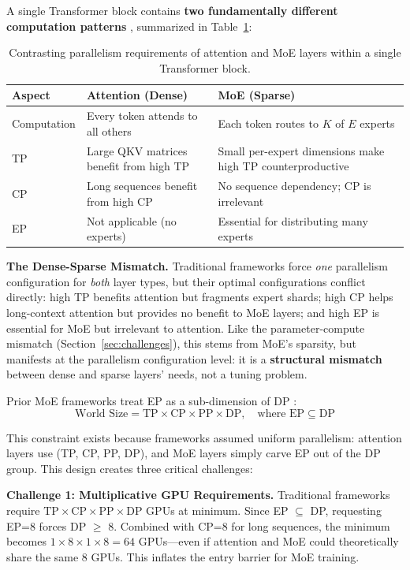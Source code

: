 A single Transformer block contains \textbf{two fundamentally different computation patterns} \cite{Singh_2023}, summarized in Table~\ref{tab:dense-sparse-comparison}:

\begin{table}[ht]
\centering
\caption{Contrasting parallelism requirements of attention and MoE layers within a single Transformer block.}
\label{tab:dense-sparse-comparison}
\begin{tabular}{lp{}p{}}
\toprule
\textbf{Aspect} & \textbf{Attention (Dense)} & \textbf{MoE (Sparse)} \\
\midrule
Computation & Every token attends to all others & Each token routes to $K$ of $E$ experts \\
TP & Large QKV matrices benefit from high TP & Small per-expert dimensions make high TP counterproductive \\
CP & Long sequences benefit from high CP & No sequence dependency; CP is irrelevant \\
EP & Not applicable (no experts) & Essential for distributing many experts \\
\bottomrule
\end{tabular}
\end{table}

\textbf{The Dense-Sparse Mismatch.} Traditional frameworks force \emph{one} parallelism configuration for \emph{both} layer types, but their optimal configurations conflict directly: high TP benefits attention but fragments expert shards; high CP helps long-context attention but provides no benefit to MoE layers; and high EP is essential for MoE but irrelevant to attention. Like the parameter-compute mismatch (Section~\ref{sec:challenges}), this stems from MoE's sparsity, but manifests at the parallelism configuration level: it is a \textbf{structural mismatch} between dense and sparse layers' needs, not a tuning problem.

Prior MoE frameworks treat EP as a sub-dimension of DP \cite{lepikhin2020gshard,fedus2022switchtransformersscalingtrillion}:
\[
\text{World Size} = \text{TP} \times \text{CP} \times \text{PP} \times \text{DP}, \quad \text{where } \text{EP} \subseteq \text{DP}
\]

This constraint exists because frameworks assumed uniform parallelism: attention layers use (TP, CP, PP, DP), and MoE layers simply carve EP out of the DP group. This design creates three critical challenges:

\textbf{Challenge 1: Multiplicative GPU Requirements.} Traditional frameworks require $\text{TP} \times \text{CP} \times \text{PP} \times \text{DP}$ GPUs at minimum. Since EP $\subseteq$ DP, requesting EP=8 forces DP $\geq$ 8. Combined with CP=8 for long sequences, the minimum becomes $1 \times 8 \times 1 \times 8 = 64$ GPUs---even if attention and MoE could theoretically share the same 8 GPUs. This inflates the entry barrier for MoE training.

